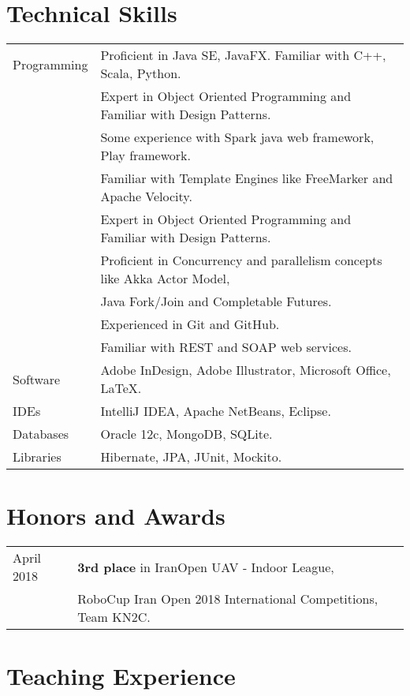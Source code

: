 \documentclass[letterpaper]{article}
\begin{document}
\section*{Technical Skills}

{\renewcommand{\arraystretch}{1.2}
\begin{tabular}{l l}
Programming & Proficient in Java SE, JavaFX. Familiar with C++, Scala, Python.
	\\& Expert in Object Oriented Programming and Familiar with Design Patterns.
	\\& Some experience with Spark java web framework, Play framework.
	\\& Familiar with Template Engines like FreeMarker and Apache Velocity.
	\\& Expert in Object Oriented Programming and Familiar with Design Patterns.
	\\& Proficient in Concurrency and parallelism concepts like Akka Actor Model,\\& Java Fork/Join and Completable Futures.
	\\& Experienced in Git and GitHub.
	\\& Familiar with REST and SOAP web services.
\\
Software & Adobe InDesign, Adobe Illustrator, Microsoft Office, LaTeX.
\\
IDEs & IntelliJ IDEA, Apache NetBeans, Eclipse.
\\
Databases & Oracle 12c, MongoDB, SQLite.
\\
Libraries & Hibernate, JPA, JUnit, Mockito.
\end{tabular}

\section*{Honors and Awards}

{\renewcommand{\arraystretch}{1.2}
\begin{tabular}{l l}
April 2018 & \textbf{3rd place} in IranOpen UAV - Indoor League, \\&RoboCup Iran Open 2018 International Competitions, Team KN2C.
\end{tabular}

\section*{Teaching Experience}

}}
\end{document}
